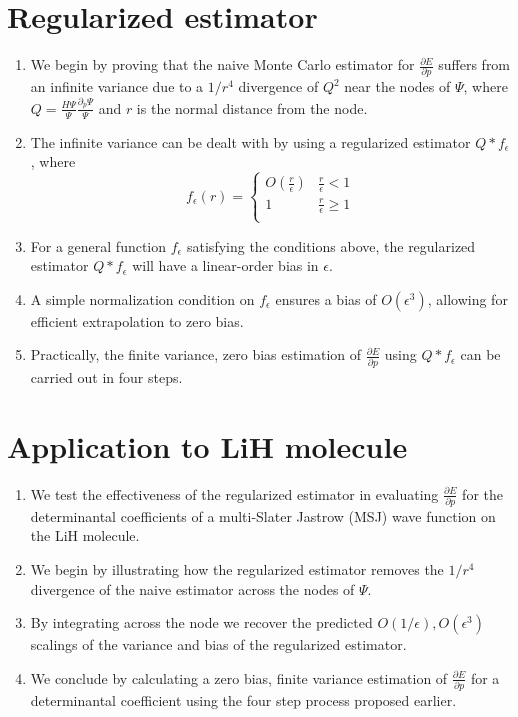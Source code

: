 \documentclass{article}
\begin{document}
\section{Regularized estimator}
\begin{enumerate}
\item We begin by proving that the naive Monte Carlo estimator for $\frac{\partial E}{\partial p}$ suffers from an infinite variance due to a $1/r^4$ divergence of $Q^2$ near the nodes of $\Psi$, where $Q = \frac{H\Psi}{\Psi}\frac{\partial_p \Psi}{\Psi}$ and $r$ is the normal distance from the node.

\item The infinite variance can be dealt with by using a regularized estimator $Q * f_\epsilon$, where 
\[ f_\epsilon(r) = \begin{cases} 
      O(\frac{r}{\epsilon}) & \frac{r}{\epsilon} < 1 \\
      1 & \frac{r}{\epsilon} \ge 1 \\
   \end{cases}
\]

\item For a general function $f_\epsilon$ satisfying the conditions above, the regularized estimator $Q * f_\epsilon$ will have a linear-order bias in $\epsilon$.

\item A simple normalization condition on $f_\epsilon$ ensures a bias of $O(\epsilon^3)$, allowing for efficient extrapolation to zero bias.

\item Practically, the finite variance, zero bias estimation of $\frac{\partial E}{\partial p}$ using $Q * f_\epsilon$ can be carried out in four steps.

\end{enumerate}

\section{Application to LiH molecule}
\begin{enumerate}
\item We test the effectiveness of the regularized estimator in evaluating $\frac{\partial E}{\partial p}$ for the determinantal coefficients of a multi-Slater Jastrow (MSJ) wave function on the LiH molecule.

\item We begin by illustrating how the regularized estimator removes the $1/r^4$ divergence of the naive estimator across the nodes of $\Psi$.

\item By integrating across the node we recover the predicted $O(1/\epsilon), O(\epsilon^3)$ scalings of the variance and bias of the regularized estimator. 

\item We conclude by calculating a zero bias, finite variance estimation of $\frac{\partial E}{\partial p}$ for a determinantal coefficient using the four step process proposed earlier.
\end{enumerate}
\end{document}
